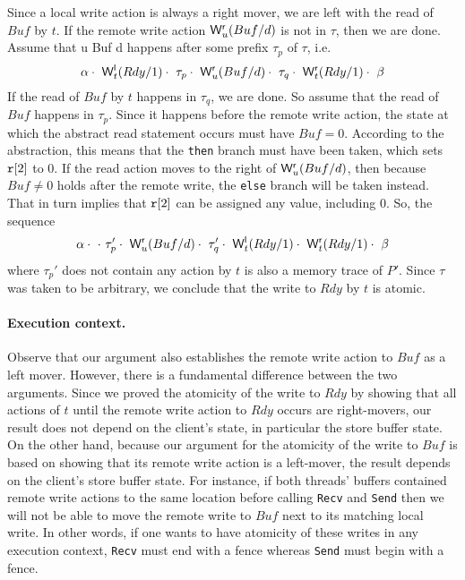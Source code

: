 Since a local write action is always a right mover, we are left with the read of $Buf$ by $t$.
If the remote write action $\mathsf{W}^{\mathsf{r}}_{u}(Buf/d)$ is not in $\tau$, then we are done.
Assume that \remwritex u {Buf} d happens after some prefix $\tau_p$ of $\tau$, i.e.
\[
\alpha\cdot\ \mathsf{W}^{\mathsf{l}}_{t}(Rdy/1)\cdot\ \tau_p\cdot\ \mathsf{W}^{\mathsf{r}}_{u}(Buf/d)\cdot\ \tau_q\cdot\ \mathsf{W}^{\mathsf{r}}_{t}(Rdy/1)\cdot\ \beta
\]
If the read of $Buf$ by $t$ happens in $\tau_q$, we are done.
So assume that the read of $Buf$ happens in $\tau_p$.
Since it happens before the remote write action, the state at which the abstract read statement occurs must have $Buf=0$.
According to the abstraction, this means that the {\tt then} branch must have been taken, which sets $\mathtt{r}[2]$ to 0.
If the read action moves to the right of $\mathsf{W}^{\mathsf{r}}_{u}(Buf/d)$, then because $Buf\neq 0$ holds after the remote write, the {\tt else} branch will be taken instead.
That in turn implies that $\mathtt{r}[2]$ can be assigned any value, including 0. 
So, the sequence
\[
\alpha\cdot\ \cdot\ \tau_p'\cdot\ \remwritex u {Buf} d\cdot\ \tau_q'\cdot\ \locwritex t {Rdy} 1\cdot\ \remwritex t {Rdy} 1\cdot\ \beta
\]
where $\tau_p'$ does not contain any action by $t$ is also a memory trace of $P'$.
Since $\tau$ was taken to be arbitrary, we conclude that the write to $Rdy$ by $t$ is atomic.

\paragraph{Execution context.}
Observe that our argument also establishes the remote write action to $Buf$ as a left mover. 
However, there is a fundamental difference between the two arguments.
Since we proved the atomicity of the write to $Rdy$ by showing that all actions of $t$ until the remote write action to $Rdy$ occurs are right-movers, our result does not depend on the client's state, in particular the store buffer state. 
On the other hand, because our argument for the atomicity of the write to $Buf$ is based on showing that its remote write action is a left-mover, the result depends on the client's store buffer state. 
For instance, if both threads' buffers contained remote write actions to the same location before calling {\tt Recv} and {\tt Send} then we will not be able to move the remote write to $Buf$ next to its matching local write.
In other words, if one wants to have atomicity of these writes in any execution context, {\tt Recv} must end with a fence whereas {\tt Send} must begin with a fence.


